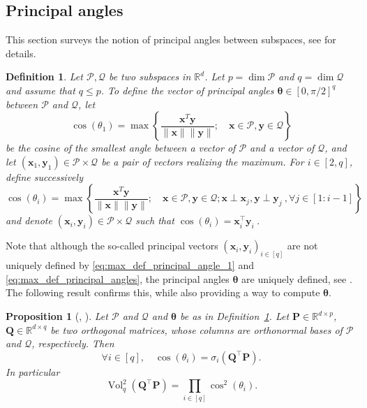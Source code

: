 \documentclass[twoside,11pt]{book}
\newtheorem{proposition}{Proposition}
\newtheorem{definition}{Definition}
\numberwithin{theorem}{chapter}
\numberwithin{definition}{chapter}
\numberwithin{proposition}{chapter}
\numberwithin{corollary}{chapter}
\numberwithin{example}{chapter}
\numberwithin{lemma}{chapter}
\DeclareMathOperator{\Vol}{Vol}
\DeclareMathOperator{\Tran}{\intercal}
\begin{document}
\subsection{Principal angles}
This section surveys the notion of principal angles between subspaces, see \cite[Section 6.4.3]{GoVa96} for details.
\begin{definition}
  \label{d:angles}
Let $\mathcal{P},\mathcal{Q}$ be two subspaces in $\mathbb{R}^{d}$. Let $p= \dim\mathcal{P}$ and $q = \dim\mathcal{Q}$ and assume that $q \leq p$. To define the vector of principal angles $\bm{\theta} \in [0,\pi/2]^{q}$ between $\mathcal{P}$ and $\mathcal{Q}$, let
\begin{equation}\label{eq:max_def_principal_angle_1}
 \cos(\theta_{1}) = \max \left\{ \frac{\bm{x}^{T}\bm{y}}{\|\bm{x}\|\|\bm{y}\|}; \quad \bm{x} \in \mathcal{P}, \bm{y} \in \mathcal{Q} \right\}
\end{equation}
be the cosine of the smallest angle between a vector of $\mathcal{P}$ and a vector of $\mathcal{Q}$, and let $(\bm{x}_{1},\bm{y}_{1}) \in \mathcal{P}\times \mathcal{Q}$ be a pair of vectors realizing the maximum. For $i \in [2,q]$, define successively
\begin{equation}\label{eq:max_def_principal_angles}
 \cos(\theta_{i}) = \max \left\{\frac{\bm{x}^{T}\bm{y}}{\|\bm{x}\|\|\bm{y}\|}; \quad \bm{x} \in \mathcal{P}, \bm{y} \in \mathcal{Q}; \bm{x} \perp \bm{x}_{j}, \bm{y} \perp \bm{y}_{j}\:, \forall j \in [1:i-1] \right\}
\end{equation}
and denote $(\bm{x}_{i},\bm{y}_{i}) \in \mathcal{P}\times\mathcal{Q}$ such that $\cos(\theta_{i}) = \bm{x}_{i}^{\Tran}\bm{y}_{i} \:$.
\end{definition}
Note that although the so-called principal vectors $(\bm{x}_{i},\bm{y}_{i})_{i \in [q]}$
are not uniquely defined by \eqref{eq:max_def_principal_angle_1} and \eqref{eq:max_def_principal_angles}, the principal angles $\bm{\theta}$ are uniquely defined, see \citep{BjGo73}. The following result confirms this, while also providing a way to compute $\bm{\theta}$.
\begin{proposition}[\citealp{BjGo73}, \citealp{Ben92}]
  \label{principal_angles_theorem_1}
Let $\mathcal{P}$ and $\mathcal{Q}$ and $\bm{\theta}$ be as in Definition~\ref{d:angles}. Let $\bm{P} \in \mathbb{R}^{d \times p}$, $\bm{Q} \in \mathbb{R}^{d \times q}$ be two orthogonal matrices, whose columns are orthonormal bases of $\mathcal{P}$ and $\mathcal{Q}$, respectively. Then
\begin{equation}
 \forall i \in [q], \quad \cos(\theta_{i}) =\sigma_i(\bm{Q}^{\Tran}\bm{P}).
\end{equation}
In particular
\begin{equation}\label{principal_angles_formula}
\Vol_{q}^{2}(\bm{Q}^{\Tran}\bm{P}) = \prod\limits_{i \in [q]} \cos^{2}(\theta_{i}).
\end{equation}
\end{proposition}
\end{document}
